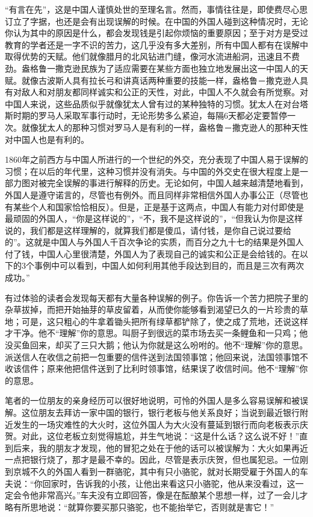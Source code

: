 \documentclass[12pt,oneside]{book}
\begin{document}
\begin{common-format}
“有言在先”，这是中国人谨慎处世的至理名言。然而，事情往往是，即使费尽心思订立了字据，也还是会有出现误解的时候。在中国的外国人碰到这种情况时，无论你认为其中的原因是什么，都会发现钱是引起你烦恼的重要原因；至于对方是受过教育的学者还是一字不识的苦力，这几乎没有多大差别，所有中国人都有在误解中取得优势的天赋。他们就像腊月的北风钻进门缝，像河水流进船洞，迅速且不费劲。盎格鲁一撒克逊民族为了适应需要在某些方面也独立地发展出这一中国人的天赋。就像古波斯人具有拉长弓和讲真话两种重要的技能一样，盎格鲁－撒克逊人具有对敌人和对朋友都同样诚实和公正的天性，对此，中国人不久就会有所觉察。对中国人来说，这些品质似乎就像犹太人曾有过的某种独特的习惯。犹太人在对台塔斯时期的罗马人采取军事行动时，无论形势多么紧迫，每隔6天都必定要暂停一次。就像犹太人的那种习惯对罗马人是有利的一样，盎格鲁－撒克逊人的那种天性对中国人也是有利的。 

1860年之前西方与中国人所进行的一个世纪的外交，充分表现了中国人易于误解的习惯；在以后的年代里，这种习惯并没有消失。与中国的外交史在很大程度上是一部力图对被完全误解的事进行解释的历史。无论如何，中国人越来越清楚地看到，外国人是遵守诺言的，尽管也有例外。而且同样非常相信外国人办事公正（尽管也有某些个人和国家恰恰相反）。但是，正是基于这两点，中国人有能力对付即使是最顽固的外国人，“你是这样说的”，“不，我不是这样说的”，“但我认为你是这样说的，我们都是这样理解的，就算我们都是傻瓜，请付钱，是你自己说过要给的”。这就是中国人与外国人千百次争论的实质，而百分之九十七的结果是外国人付了钱，中国人心里很清楚，外国人为了表现自己的诚实和公正是会给钱的。在以下的3个事例中可以看到，中国人如何利用其他手段达到目的，而且是三次有两次成功。” 

有过体验的读者会发现每天都有大量各种误解的例子。你告诉一个苦力把院子里的杂草拔掉，而把开始抽芽的草皮留着，从而使你能够看到渴望已久的一片珍贵的草地；可是，这只粗心的牛拿着锄头把所有绿草都铲除了，使之成了荒地，还说这样才干净。他不“理解”你的意思。叫厨子到很远的菜市场去买一条鲤鱼和一只鸡；他没买鱼回来，却买了三只大鹅；他认为你就是这么吩咐的。他不“理解”你的意思。派送信人在收信之前把一包重要的信件送到法国领事馆；他回来说，法国领事馆不收该信件；原来他把信件送到了比利时领事馆，结果误了收信时间。他不“理解”你的意思。 

笔者的一位朋友的亲身经历可以很好地说明，可怜的外国人是多么容易误解和被误解。这位朋友去拜访一家中国的银行，银行老板与他关系良好；当说到最近银行附近发生的一场灾难性的大火时，这位外国人为大火没有蔓延到银行而向老板表示庆贺。对此，这位老板立刻觉得尴尬，并生气地说：“这是什么话？这么说不好！”直到后来，我的朋友才发现，他的冒犯之处在于他的话可以被误解为：大火如果再近一点把银行烧了，那才是最不幸的。因此，尽管是表示庆贺，但也属犯忌。一位刚到京城不久的外国人看到一群骆驼，其中有只小骆驼，就对长期受雇于外国人的车夫说：“你回家时，告诉我的小孩，让他出来看这只小骆驼，他从来没看过，这一定会令他非常高兴。”车夫没有立即回答，像是在酝酿某个思想一样，过了一会儿才略有所思地说：“就算你要买那只骆驼，也不能抬举它，否则就是害它！” 


\end{common-format}
\end{document}
